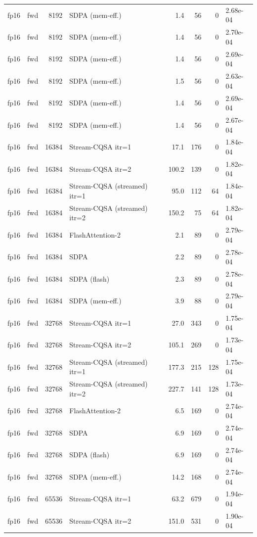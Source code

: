 \begin{tabular}{llrlrrrl}
fp16 & fwd & 8192 & SDPA (mem-eff.) & 1.4 & 56 & 0 & 2.68e-04 \\
fp16 & fwd & 8192 & SDPA (mem-eff.) & 1.4 & 56 & 0 & 2.70e-04 \\
fp16 & fwd & 8192 & SDPA (mem-eff.) & 1.4 & 56 & 0 & 2.69e-04 \\
fp16 & fwd & 8192 & SDPA (mem-eff.) & 1.5 & 56 & 0 & 2.63e-04 \\
fp16 & fwd & 8192 & SDPA (mem-eff.) & 1.4 & 56 & 0 & 2.69e-04 \\
fp16 & fwd & 8192 & SDPA (mem-eff.) & 1.4 & 56 & 0 & 2.67e-04 \\
fp16 & fwd & 16384 & Stream-CQSA itr=1 & 17.1 & 176 & 0 & 1.84e-04 \\
fp16 & fwd & 16384 & Stream-CQSA itr=2 & 100.2 & 139 & 0 & 1.82e-04 \\
fp16 & fwd & 16384 & Stream-CQSA (streamed) itr=1 & 95.0 & 112 & 64 & 1.84e-04 \\
fp16 & fwd & 16384 & Stream-CQSA (streamed) itr=2 & 150.2 & 75 & 64 & 1.82e-04 \\
fp16 & fwd & 16384 & FlashAttention-2 & 2.1 & 89 & 0 & 2.79e-04 \\
fp16 & fwd & 16384 & SDPA & 2.2 & 89 & 0 & 2.78e-04 \\
fp16 & fwd & 16384 & SDPA (flash) & 2.3 & 89 & 0 & 2.78e-04 \\
fp16 & fwd & 16384 & SDPA (mem-eff.) & 3.9 & 88 & 0 & 2.79e-04 \\
fp16 & fwd & 32768 & Stream-CQSA itr=1 & 27.0 & 343 & 0 & 1.75e-04 \\
fp16 & fwd & 32768 & Stream-CQSA itr=2 & 105.1 & 269 & 0 & 1.73e-04 \\
fp16 & fwd & 32768 & Stream-CQSA (streamed) itr=1 & 177.3 & 215 & 128 & 1.75e-04 \\
fp16 & fwd & 32768 & Stream-CQSA (streamed) itr=2 & 227.7 & 141 & 128 & 1.73e-04 \\
fp16 & fwd & 32768 & FlashAttention-2 & 6.5 & 169 & 0 & 2.74e-04 \\
fp16 & fwd & 32768 & SDPA & 6.9 & 169 & 0 & 2.74e-04 \\
fp16 & fwd & 32768 & SDPA (flash) & 6.9 & 169 & 0 & 2.74e-04 \\
fp16 & fwd & 32768 & SDPA (mem-eff.) & 14.2 & 168 & 0 & 2.74e-04 \\
fp16 & fwd & 65536 & Stream-CQSA itr=1 & 63.2 & 679 & 0 & 1.94e-04 \\
fp16 & fwd & 65536 & Stream-CQSA itr=2 & 151.0 & 531 & 0 & 1.90e-04 \\

\end{tabular}

